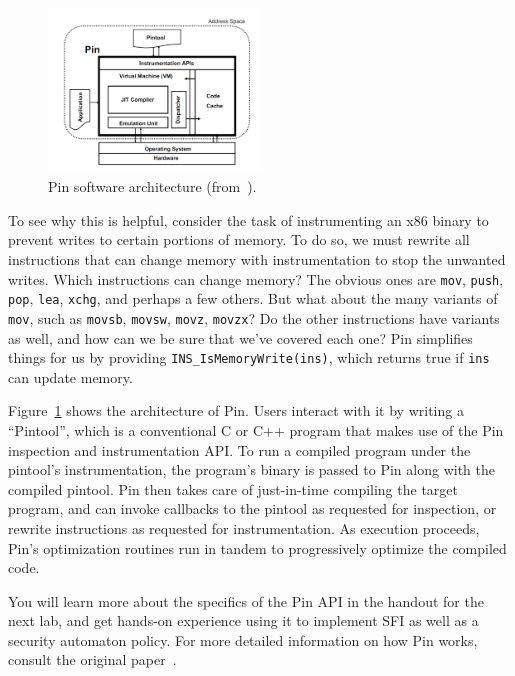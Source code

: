 \documentclass[11pt,twoside]{scrartcl}
\begin{document}
\begin{figure}[t]
\centering
\includegraphics[width=0.5\textwidth]{pin.pdf}
\caption{Pin software architecture (from~\cite{Luk2005}).}
\label{fig:pin}
\end{figure}

To see why this is helpful, consider the task of instrumenting an x86 binary to prevent writes to certain portions of memory. To do so, we must rewrite all instructions that can change memory with instrumentation to stop the unwanted writes. Which instructions can change memory? The obvious ones are \verb'mov', \verb'push', \verb'pop', \verb'lea', \verb'xchg', and perhaps a few others. But what about the many variants of \verb'mov', such as \verb'movsb', \verb'movsw', \verb'movz', \verb'movzx'? Do the other instructions have variants as well, and how can we be sure that we've covered each one? Pin simplifies things for us by providing \verb'INS_IsMemoryWrite(ins)', which returns true if \verb'ins' can update memory.

Figure~\ref{fig:pin} shows the architecture of Pin. Users interact with it by writing a ``Pintool'', which is a conventional C or C++ program that makes use of the Pin inspection and instrumentation API. To run a compiled program under the pintool's instrumentation, the program's binary is passed to Pin along with the compiled pintool. Pin then takes care of just-in-time compiling the target program, and can invoke callbacks to the pintool as requested for inspection, or rewrite instructions as requested for instrumentation. As execution proceeds, Pin's optimization routines run in tandem to progressively optimize the compiled code.

You will learn more about the specifics of the Pin API in the handout for the next lab, and get hands-on experience using it to implement SFI as well as a security automaton policy. For more detailed information on how Pin works, consult the original paper~\cite{Luk2005}.



\end{document}
